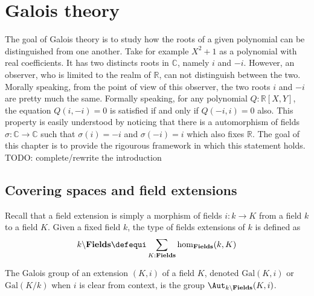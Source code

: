 \chapter{Galois theory}%
\label{chap:galois-theory}%

The goal of Galois theory is to study how the roots of a given polynomial can
be distinguished from one another. Take for example $X^2+1$ as a polynomial
with real coefficients. It has two distincts roots in $\mathbb C$, namely $i$
and $-i$. However, an observer, who is limited to the realm of $\mathbb R$,
can not distinguish between the two. Morally speaking, from the point of view
of this observer, the two roots $i$ and $-i$ are pretty much the same. Formally
speaking, for any polynomial $Q: \mathbb R[X,Y]$, the equation $Q(i,-i) = 0$ is
satisfied if and only if $Q(-i,i) = 0$ also. This property is easily understood
by noticing that there is a automorphism of fields $\sigma: \mathbb C  \to
\mathbb C$ such that $\sigma(i) = -i$ and $\sigma(-i) = i$ which also fixes
$\mathbb R$. The goal of this chapter is to provide the rigourous framework in
which this statement holds.
{\color{red} TODO: complete/rewrite the introduction}

\section{Covering spaces and field extensions}
\label{sec:cover-spac-fields}

\def\fieldstype{\mathbf{Fields}}%
\def\Gal{\mathrm{Gal}}%
\def\fieldshom{\hom_{\fieldstype}}%
\def\isHom{\mathrm{isHom}}%
\def\iso{\mathrm{Iso}}%
\newcommand\restr[1]{{{#1}^\ast}}%
\newcommand\fieldsext[1]{#1\backslash\fieldstype}%
Recall that a field extension is simply a morphism of fields $i: k\to K$ from a
field $k$ to a field $K$. Given a fixed field $k$, the type of fields
extensions of $k$ is defined as
\begin{displaymath}
  \fieldsext k \defequi \sum_{K:\fieldstype}\fieldshom(k,K)
\end{displaymath}

\begin{definition}
  The Galois group of an extension $(K,i)$ of a field $K$, denoted $\Gal(K,i)$
  or $\Gal(K/k)$ when $i$ is clear from context, is the group
  $\Aut_{\fieldsext k}{(K,i)}$.
  \label{def:galois-group}
\end{definition}

